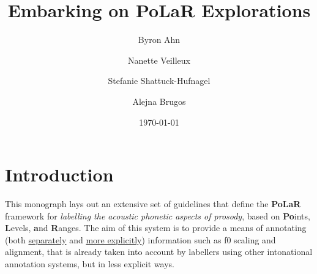 \documentclass[11pt, twoside]{memoir}
\def\THIStitle{Embarking on PoLaR Explorations}
\def\THISsubtitle{A Framework for Intonational Annotation and Analysis}
\begin{document}
\frontmatter
{}

\title{\THIStitle}
\author{Byron Ahn \and Nanette Veilleux \and Stefanie Shattuck-Hufnagel \and Alejna Brugos}
\date{\today}


\tableofcontents
\newpage
\listoffigures
\listoftables
\newpage

\mainmatter

\section*{Introduction}\label{sec:introduction}

\setcounter{footnote}{0}
\renewcommand*{\thefootnote}{\fnsymbol{footnote}}

This monograph lays out an extensive set of guidelines that define the \textbf{PoLaR} framework for \textit{labelling the acoustic phonetic aspects of prosody}, based on \textbf{Po}ints, \textbf{L}evels, \textbf{a}nd \textbf{R}anges.  The aim of this system is to provide a means of annotating (both \uline{separately} and \uline{more explicitly}) information such as f0 scaling and alignment, that is already taken into account by labellers using other intonational annotation systems, but in less explicit ways.
\end{document}
